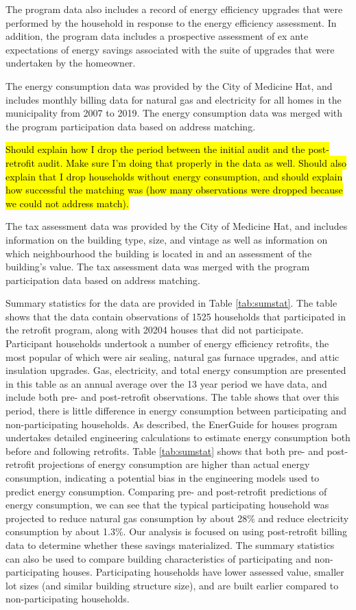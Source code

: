 \documentclass{article}
\newcommand{\hlc}[2][yellow]{ {\sethlcolor{#1} \hl{#2}} }
\begin{document}
The program data also includes a record of energy efficiency upgrades that were performed by the household in response to the energy efficiency assessment. In addition, the program data includes a prospective assessment of ex ante expectations of energy savings associated with the suite of upgrades that were undertaken by the homeowner.

The energy consumption data was provided by the City of Medicine Hat, and includes monthly billing data for natural gas and electricity for all homes in the municipality from 2007 to 2019.  The energy consumption data was merged with the program participation data based on address matching.

\hlc{Should explain how I drop the period between the initial audit and the post-retrofit audit. Make sure I'm doing that properly in the data as well. Should also explain that I drop households without energy consumption, and should explain how successful the matching was (how many observations were dropped because we could not address match).}

The tax assessment data was provided by the City of Medicine Hat, and includes information on the building type, size, and vintage as well as information on which neighbourhood the building is located in and an assessment of the building's value. The tax assessment data was merged with the program participation data based on address matching.

Summary statistics for the data are provided in Table \ref{tab:sumstat}. The table shows that the data contain observations of 1525 households that participated in the retrofit program, along with 20204 houses that did not participate.  Participant households undertook a number of energy efficiency retrofits, the most popular of which were air sealing, natural gas furnace upgrades, and attic insulation upgrades.  Gas, electricity, and total energy consumption are presented in this table as an annual average over the 13 year period we have data, and include both pre- and post-retrofit observations. The table shows that over this period, there is little difference in energy consumption between participating and non-participating households. As described, the EnerGuide for houses program undertakes detailed engineering calculations to estimate energy consumption both before and following retrofits. Table \ref{tab:sumstat} shows that both pre- and post-retrofit projections of energy consumption are higher than actual energy consumption, indicating a potential bias in the engineering models used to predict energy consumption. Comparing pre- and post-retrofit predictions of energy consumption, we can see that the typical participating household was projected to reduce natural gas consumption by about 28\% and reduce electricity consumption by about 1.3\%. Our analysis is focused on using post-retrofit billing data to determine whether these savings materialized.  The summary statistics can also be used to compare building characteristics of participating and non-participating houses. Participating households have lower assessed value, smaller lot sizes (and similar building structure size), and are built earlier compared to non-participating households.
\end{document}
